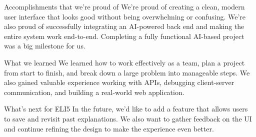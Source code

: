 Accomplishments that we're proud of
We’re proud of creating a clean, modern user interface that looks good without being overwhelming or confusing. We’re also proud of successfully integrating an AI-powered back end and making the entire system work end-to-end. Completing a fully functional AI-based project was a big milestone for us.

What we learned
We learned how to work effectively as a team, plan a project from start to finish, and break down a large problem into manageable steps. We also gained valuable experience working with APIs, debugging client-server communication, and building a real-world web application.

What's next for ELI5
In the future, we’d like to add a feature that allows users to save and revisit past explanations. We also want to gather feedback on the UI and continue refining the design to make the experience even better.
